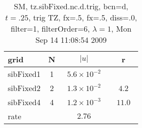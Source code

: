 \begin{table}[hbt]\tableFont %
\begin{center}
\begin{tabular}{|l|c|c|c|} \hline 
grid  & N &  $\vert u \vert$   & r \\ \hline 
           sibFixed1 &     1 & ~$5.6\times10^{ -2}$~ &            \\ \hline
           sibFixed2 &     2 & ~$1.3\times10^{ -2}$~ & ~$  4.2$~  \\ \hline
           sibFixed4 &     4 & ~$1.2\times10^{ -3}$~ & ~$ 11.0$~  \\ \hline
    rate             &       &       $2.76$         &        \\ \hline
\end{tabular}
\caption{SM, tz.sibFixed.nc.d.trig, bcn=d, $t=.25$, trig TZ, fx=.5, fx=.5, diss=.0, filter=1, filterOrder=6, $\lambda=1$, Mon Sep 14 11:08:54 2009}\label{table:tz.sibFixed.nc.d.trig}
\end{center}
\end{table}
